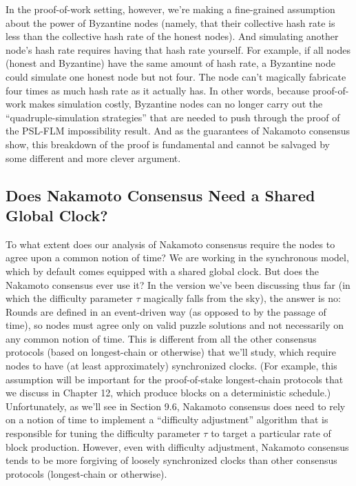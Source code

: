 In the proof-of-work setting, however, we’re making a fine-grained assumption about the
power of Byzantine nodes (namely, that their collective hash rate is less than the collective
hash rate of the honest nodes). And simulating another node’s hash rate requires having
that hash rate yourself. For example, if all nodes (honest and Byzantine) have the same
amount of hash rate, a Byzantine node could simulate one honest node but not four. The
node can’t magically fabricate four times as much hash rate as it actually has. In other
words, because proof-of-work makes simulation costly, Byzantine nodes can no longer carry
out the “quadruple-simulation strategies” that are needed to push through the proof of the
PSL-FLM impossibility result. And as the guarantees of Nakamoto consensus show, this
breakdown of the proof is fundamental and cannot be salvaged by some different and more
clever argument.\\

\subsection{Does Nakamoto Consensus Need a Shared Global Clock?}
To what extent does our analysis of Nakamoto consensus require the nodes to agree upon a
common notion of time? We are working in the synchronous model, which by default comes
equipped with a shared global clock. But does the Nakamoto consensus ever use it? In the
version we've been discussing thus far (in which the difficulty parameter $\tau$ magically falls
from the sky), the answer is no: Rounds are defined in an event-driven way (as opposed to by
the passage of time), so nodes must agree only on valid puzzle solutions and not necessarily
on any common notion of time. This is different from all the other consensus protocols
(based on longest-chain or otherwise) that we’ll study, which require nodes to have (at least
approximately) synchronized clocks. (For example, this assumption will be important for the
proof-of-stake longest-chain protocols that we discuss in Chapter 12, which produce blocks
on a deterministic schedule.)\\

Unfortunately, as we’ll see in Section 9.6, Nakamoto consensus does need to rely on a notion
of time to implement a “difficulty adjustment” algorithm that is responsible for tuning the
difficulty parameter $\tau$ to target a particular rate of block production. However, even with difficulty
adjustment, Nakamoto consensus tends to be more forgiving of loosely synchronized
clocks than other consensus protocols (longest-chain or otherwise).

